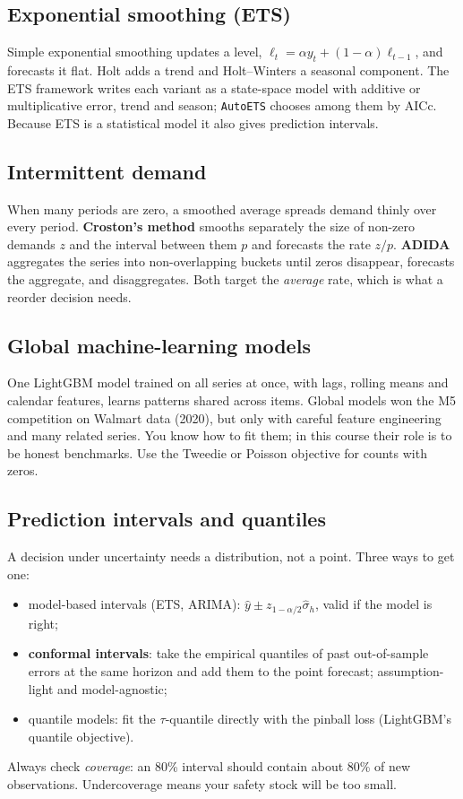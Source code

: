 \subsection{Exponential smoothing (ETS)}
Simple exponential smoothing updates a level, $\ell_t=\alpha y_t+(1-\alpha)\ell_{t-1}$, and forecasts it flat. Holt adds
a trend and Holt--Winters a seasonal component. The ETS framework writes each variant as a state-space model with
additive or multiplicative error, trend and season; \texttt{AutoETS} chooses among them by AICc. Because ETS is a
statistical model it also gives prediction intervals.

\subsection{Intermittent demand}
When many periods are zero, a smoothed average spreads demand thinly over every period. \textbf{Croston's method}
smooths separately the size of non-zero demands $z$ and the interval between them $p$ and forecasts the rate $z/p$.
\textbf{ADIDA} aggregates the series into non-overlapping buckets until zeros disappear, forecasts the aggregate,
and disaggregates. Both target the \emph{average} rate, which is what a reorder decision needs.

\subsection{Global machine-learning models}
One LightGBM model trained on all series at once, with lags, rolling means and calendar features, learns patterns
shared across items. Global models won the M5 competition on Walmart data (2020), but only with careful feature
engineering and many related series. You know how to fit them; in this course their role is to be honest
benchmarks. Use the Tweedie or Poisson objective for counts with zeros.

\subsection{Prediction intervals and quantiles}
A decision under uncertainty needs a distribution, not a point. Three ways to get one:
\begin{itemize}[nosep]
\item model-based intervals (ETS, ARIMA): $\hat y\pm z_{1-\alpha/2}\hat\sigma_h$, valid if the model is right;
\item \textbf{conformal intervals}: take the empirical quantiles of past out-of-sample errors at the same horizon
and add them to the point forecast; assumption-light and model-agnostic;
\item quantile models: fit the $\tau$-quantile directly with the pinball loss (LightGBM's quantile objective).
\end{itemize}
Always check \emph{coverage}: an 80\% interval should contain about 80\% of new observations. Undercoverage means your
safety stock will be too small.

